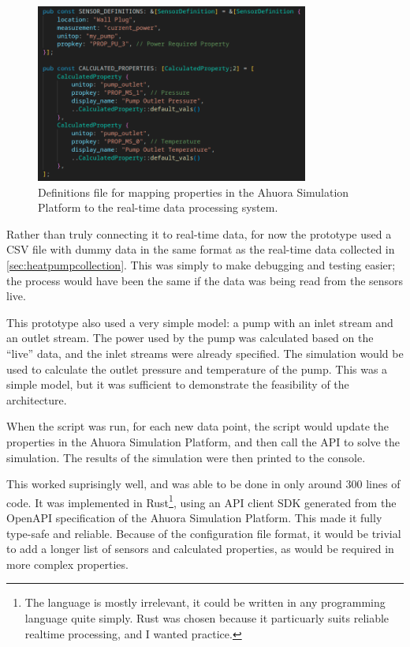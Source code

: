 \documentclass[12pt]{report}
\begin{document}
\begin{figure}
    \centering
    \includegraphics[width=0.8\textwidth]{live_constants.png}
    \caption{Definitions file for mapping properties in the Ahuora Simulation Platform to the real-time data processing system.}
    \label{fig:live-constants}
\end{figure}

Rather than truly connecting it to real-time data, for now the prototype used a CSV file with dummy data in the same format as the real-time data collected in \cref{sec:heatpumpcollection}. This was simply to make debugging and testing easier; the process would have been the same if the data was being read from the sensors live.

This prototype also used a very simple model: a pump with an inlet stream and an outlet stream. The power used by the pump was calculated based on the  ``live'' data, and the inlet streams were already specified. The simulation would be used to calculate the outlet pressure and temperature of the pump. This was a simple model, but it was sufficient to demonstrate the feasibility of the architecture.


When the script was run, for each new data point, the script would update the properties in the Ahuora Simulation Platform, and then call the API to solve the simulation. The results of the simulation were then printed to the console. 

This worked suprisingly well, and was able to be done in only around 300 lines of code. It was implemented in Rust\footnote{The language is mostly irrelevant, it could be written in any programming language quite simply. Rust was chosen because it particuarly suits reliable realtime processing, and I wanted practice.}, using an API client SDK generated from the OpenAPI specification of the Ahuora Simulation Platform. This made it fully type-safe and reliable. Because of the configuration file format, it would be trivial to add a longer list of sensors and calculated properties, as would be required in more complex properties.
\end{document}
